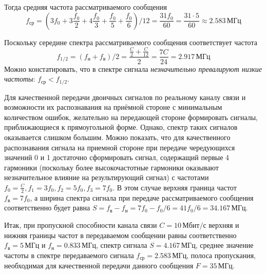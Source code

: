 Тогда средняя частота рассматриваемого сообщения
\[
	f_{\text{ср}} = \left(3f_0+3\frac{f_0}{2}+4\frac{f_0}{3}+\frac{f_0}{5}+\frac{f_0}{6}\right)/ 12 = \frac{31f_0}{60} = \frac{31 \cdot 5}{60} \approx 2.583 \, \text{МГц}
\]

Поскольку середине спектра рассматриваемого сообщения соответствует частота
\[
	f_{1/2} = (f_{\text{н}} + f_{\text{в}}) /2 = \frac{\frac{C}{2} + \frac{C}{12}}{2} = \frac{7C}{24} = 2.917 \, \text{МГц}
\]
Можно констатировать, что в спектре сигнала \textit{незначительно превалируют низкие частоты}: $f_{\text{ср}} < f_{1/2}$.

Для качественной передачи двоичных сигналов по реальному каналу связи и возможности их распознавания на приёмной стороне с минимальным количеством ошибок, желательно на передающей стороне формировать сигналы, приближающиеся к прямоугольной форме. Однако, спектр таких сигналов оказывается слишком большим. Можно показать, что для качественного распознавания сигнала на приемной стороне при передаче чередующихся значений 0 и 1 достаточно сформировать сигнал, содержащий первые 4 гармоники (поскольку более высокочастотные гармоники оказывают незначительное влияние на результирующий сигнал) с частотами $f_0=\frac{C}{2}, f_1=3f_0, f_2=5f_0, f_3=7f_0$. В этом случае верхняя граница частот $f_{\text{в}}=7f_0$, а ширина спектра сигнала при передаче рассматриваемого сообщения соответственно будет равна $S = f_{\text{в}} - f_{\text{н}} = 7f_0-f_0/6=41f_0/6=34.167 \, \text{МГц}$.

Итак, при пропускной способности канала связи $C = 10 \, \text{Мбит/с}$ верхняя и нижняя границы частот в передаваемом сообщении равны соответственно $f_{\text{в}} = 5 \, \text{МГц}$ и $f_{\text{н}} = 0.833 \, \text{МГц}$, спектр сигнала $S = 4.167 \, \text{МГц}$, среднее значение частоты в спектре передаваемого сигнала $f_{\text{ср}} = 2.583 \, \text{МГц}$, полоса пропускания, необходимая для качественной передачи данного сообщения $F=35 \, \text{МГц}$.
